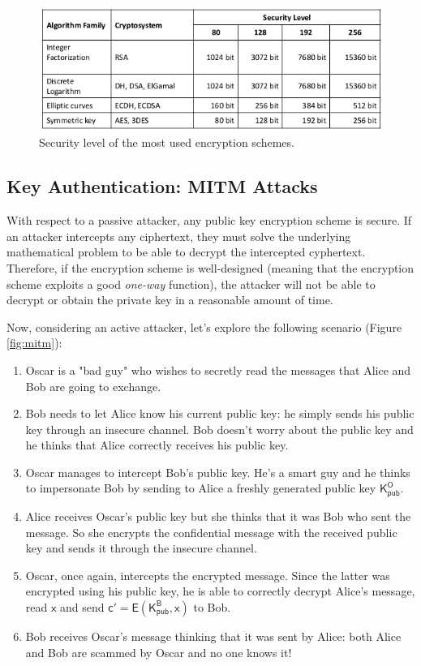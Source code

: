 \documentclass{article}
\begin{document}
\begin{figure}
    \centering
    \includegraphics[width=0.75\linewidth]{figures/security_level.png}
    \caption{\label{fig:security_level}Security level of the most used encryption schemes.}
\end{figure}


\subsection{Key Authentication: MITM Attacks}

\par \noindent With respect to a passive attacker, any public key encryption scheme is secure. If an attacker intercepts any ciphertext, they must solve the underlying mathematical problem to be able to decrypt the intercepted cyphertext. Therefore, if the encryption scheme is well-designed (meaning that the encryption scheme exploits a good \textit{one-way} function), the attacker will not be able to decrypt or obtain the private key in a reasonable amount of time.

\par \noindent Now, considering an active attacker, let's explore the following scenario (Figure \ref{fig:mitm}):

\begin{enumerate}
    \item Oscar is a "bad guy" who wishes to secretly read the messages that Alice and Bob are going to exchange.
    \item Bob needs to let Alice know his current public key: he simply sends his public key through an insecure channel. Bob doesn't worry about the public key and he thinks that Alice correctly receives  his public key.
    \item Oscar manages to intercept Bob's public key. He's a smart guy and he thinks to impersonate Bob by sending to Alice a freshly generated public key $\mathsf{K_{pub}^{O}}$.
    \item Alice receives Oscar's public key but she thinks that it was Bob who sent the message. So she encrypts the confidential message with the received public key and sends it through the insecure channel.
    \item Oscar, once again, intercepts the encrypted message. Since the latter was encrypted using his public key, he is able to correctly decrypt Alice's message, read $\mathsf{x}$ and send $\mathsf{c' = E(K_{pub}^{B}, x)}$ to Bob.
    \item Bob receives Oscar's message thinking that it was sent by Alice: both Alice and Bob are scammed by Oscar and no one knows it!
\end{enumerate}
\end{document}
